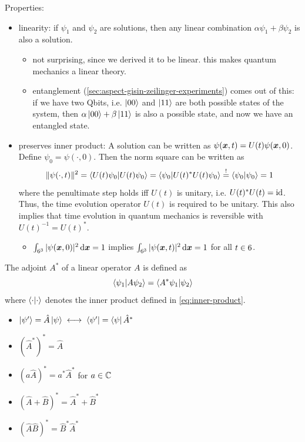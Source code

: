 Properties:
\begin{itemize}
  \item linearity: 
  if $\psi_1$ and $\psi_2$ are solutions, then any linear combination $\alpha \psi_1 + \beta \psi_2$ is also a solution.
  \begin{itemize}
    \item not surprising, since we derived it to be linear. this makes quantum mechanics a linear theory.
    \item entanglement (\autoref{sec:aspect-gisin-zeilinger-experiments}) comes out of this: if we have two Qbits, i.e. $\ket{00}$ and $\ket{11}$ are both possible states of the system, then $\alpha \ket{00} + \beta \ket{11}$ is also a possible state, and now we have an entangled state.
  \end{itemize}
  \item preserves inner product:
  A solution can be written as $\psi({\boldsymbol{x}}, t) = U(t) \psi({\boldsymbol{x}}, 0)$.
  Define $\psi_0 = \psi(\cdot, 0)$.
  Then the norm square can be written as
  \[
  \|\psi(\cdot, t)\|^2
  =
  \braket{U(t)\psi_0|U(t)\psi_0}
  =
  \braket{\psi_0|U(t)^* U(t)\psi_0}
  \overset{!}{=}
  \braket{\psi_0|\psi_0} 
  = 
  1
  \]
  where the penultimate step holds iff $U(t)$ is unitary, i.e. $U(t)^* U(t) = \operatorname{id}$.
  Thus, the time evolution operator $U(t)$ is required to be unitary.
  This also implies that time evolution in quantum mechanics is reversible with $U(t)^{-1} = U(t)^*$.
  \begin{itemize}
  \item $\int_{6^3} |\psi({\boldsymbol{x}}, 0)|^2 \,\mathrm{d}{\boldsymbol{x}} = 1$ implies $\int_{6^3} |\psi({\boldsymbol{x}}, t)|^2 \,\mathrm{d}{\boldsymbol{x}} = 1$ for all $t \in 6$.
  \end{itemize}
\end{itemize}



\begin{definition}\label{def:adjoint}
The adjoint $A^*$ of a linear operator $A$ is defined as
\[
\braket{\psi_1|A\psi_2} = \braket{A^*\psi_1|\psi_2}
\]
where $\braket{\cdot|\cdot}$ denotes the inner product defined in \eqref{eq:inner-product}.
\end{definition}


\begin{fact}
\nopagebreak
\leavevmode
\nopagebreak
\begin{itemize}\nopagebreak
  \item $\ket{\psi'} = \hat{A} \ket{\psi} \; \longleftrightarrow \; \bra{\psi'} = \bra{\psi} \hat{A}^*$
  \item $(\hat{A}^*)^* = \hat{A}$
  \item $(a \hat{A})^* = a^* \hat{A}^*$ for $a \in \mathbb{C}$
  \item $(\hat{A} + \hat{B})^* = \hat{A}^* + \hat{B}^*$
  \item $(\hat{A} \hat{B})^* = \hat{B}^* \hat{A}^*$
  \qedhere
\end{itemize}
\end{fact}




